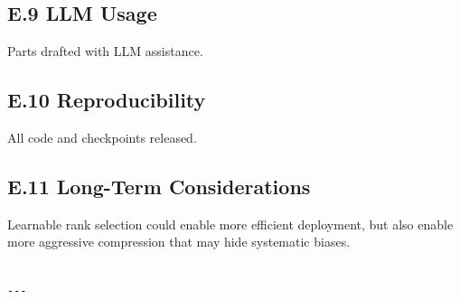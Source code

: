 \subsection{E.9 LLM Usage}
Parts drafted with LLM assistance.

\subsection{E.10 Reproducibility}
All code and checkpoints released.

\subsection{E.11 Long-Term Considerations}
Learnable rank selection could enable more efficient deployment, but also 
enable more aggressive compression that may hide systematic biases.
\begin{lstlisting}

---
\end{lstlisting}

